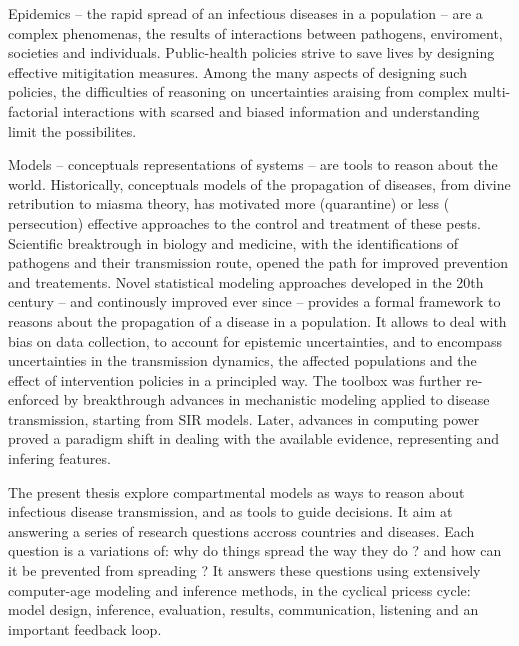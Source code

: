 Epidemics -- the rapid spread of an infectious diseases in a population -- are a complex phenomenas, the results of interactions between pathogens, enviroment, societies and individuals\cite{Rinaldo:RiverNetworksEcological:2020a, Buckee:ThinkingClearlySocial:2021, Heesterbeek:ModelingInfectiousDisease:2015}. Public-health policies strive to save lives by designing effective mitigitation measures. Among the many aspects of designing such policies, the difficulties of reasoning on uncertainties araising from complex multi-factorial interactions with scarsed and biased information and understanding limit the possibilites. 

Models -- conceptuals representations of systems -- are tools to reason about the world. Historically, conceptuals models of the propagation of diseases, from divine retribution to miasma theory, has motivated more (quarantine) or less (
persecution) effective approaches to the control and treatment of these pests. Scientific breaktrough in biology and medicine, with the identifications of pathogens and their transmission route, opened the path for improved prevention and treatements. Novel statistical modeling approaches\cite[-3\baselineskip]{Freedman:AssociationCausationRemarks:1999} developed in the 20th century -- and continously improved ever since\cite{Gelman:WhatAreMost:2021} --  provides a formal framework to reasons about the propagation of a disease in a population. It allows to deal with bias on data collection, to account for epistemic uncertainties, and to encompass uncertainties in the transmission dynamics, the affected populations and the effect of intervention policies in a principled way. The toolbox was further re-enforced by breakthrough advances in mechanistic modeling applied to disease transmission, starting from SIR models\cite{Kermack:ContributionMathematicalTheory:1927, Anderson:PopulationBiologyInfectious:1979}. Later, advances in computing power proved a paradigm shift in dealing with the available evidence, representing and infering features. 

The present thesis explore compartmental models as ways to reason about infectious disease transmission, and as tools to guide decisions. It aim at answering a series of research questions accross countries and diseases. Each question is a variations of: why do things spread the way they do ? and how can it be prevented from spreading ? It answers these questions using extensively computer-age modeling and inference methods, in the cyclical pricess cycle: model design, inference, evaluation, results, communication, listening and an important feedback loop.

